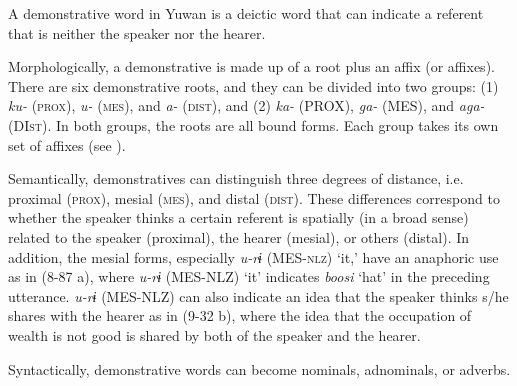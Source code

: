 A demonstrative word in Yuwan is a deictic word that can indicate a referent that is neither the speaker nor the hearer.

  Morphologically, a demonstrative is made up of a root plus an affix (or affixes). There are six demonstrative roots, and they can be divided into two groups: (1) \textit{ku-} (\textsc{prox}), \textit{u-} (\textsc{mes}), and \textit{a-} (\textsc{dist}), and (2) \textit{ka-} (PROX), \textit{ga-} (MES), and \textit{aga-} (DI\textsc{st}). In both groups, the roots are all bound forms. Each group takes its own set of affixes (see ).

  Semantically, demonstratives can distinguish three degrees of distance, i.e. proximal (\textsc{prox}), mesial (\textsc{mes}), and distal (\textsc{dist}). These differences correspond to whether the speaker thinks a certain referent is spatially (in a broad sense) related to the speaker (proximal), the hearer (mesial), or others (distal). In addition, the mesial forms, especially \textit{u-rɨ} (MES-\textsc{nlz}) ‘it,’ have an anaphoric use as in (8-87 a), where \textit{u-rɨ} (MES-NLZ) ‘it’ indicates \textit{boosi} ‘hat’ in the preceding utterance. \textit{u-rɨ} (MES-NLZ) can also indicate an idea that the speaker thinks s/he shares with the hearer as in (9-32 b), where the idea that the occupation of wealth is not good is shared by both of the speaker and the hearer.

Syntactically, demonstrative words can become nominals, adnominals, or adverbs.

